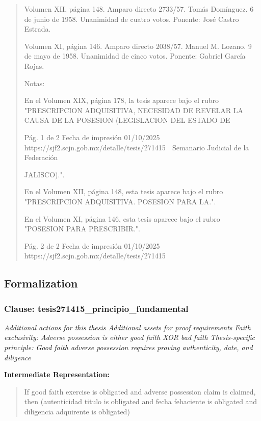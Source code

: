 \documentclass[11pt,a4paper]{article}
\begin{document}
\begin{quote}
Volumen XII, página 148. Amparo directo 2733/57. Tomás Domínguez. 6 de junio de 1958.
Unanimidad de cuatro votos. Ponente: José Castro Estrada.

Volumen XI, página 146. Amparo directo 2038/57. Manuel M. Lozano. 9 de mayo de 1958.
Unanimidad de cinco votos. Ponente: Gabriel García Rojas.

Notas:

En el Volumen XIX, página 178, la tesis aparece bajo el rubro "PRESCRIPCION ADQUISITIVA,
NECESIDAD DE REVELAR LA CAUSA DE LA POSESION (LEGISLACION DEL ESTADO DE

                                             Pág. 1 de 2             Fecha de impresión 01/10/2025
  https://sjf2.scjn.gob.mx/detalle/tesis/271415
                                                  Semanario Judicial de la Federación

JALISCO).".

En el Volumen XII, página 148, esta tesis aparece bajo el rubro "PRESCRIPCION ADQUISITIVA.
POSESION PARA LA.".

En el Volumen XI, página 146, esta tesis aparece bajo el rubro "POSESION PARA PRESCRIBIR.".




                                             Pág. 2 de 2       Fecha de impresión 01/10/2025
  https://sjf2.scjn.gob.mx/detalle/tesis/271415

\end{quote}

\subsection{Formalization}

\subsubsection{Clause: tesis271415\_principio\_fundamental}

\textit{Additional actions for this thesis Additional assets for proof requirements Faith exclusivity: Adverse possession is either good faith XOR bad faith Thesis-specific principle: Good faith adverse possession requires proving authenticity, date, and diligence}

\textbf{Intermediate Representation:}

\begin{quote}
If good faith exercise is obligated and adverse possession claim is claimed, then (autenticidad titulo is obligated and fecha fehaciente is obligated and diligencia adquirente is obligated)
\end{quote}
\end{document}
